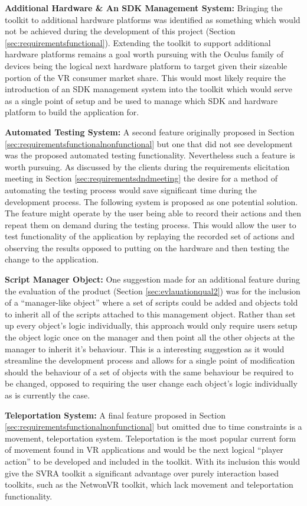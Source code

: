 \documentclass{l4proj}
\begin{document}
\textbf{Additional Hardware \& An SDK Management System:} Bringing the toolkit to additional hardware platforms was identified as something which would not be achieved during the development of this project (Section \ref{sec:requirementsfunctional}). Extending the toolkit to support additional hardware platforms remains a goal worth pursuing with the Oculus family of devices being the logical next hardware platform to target given their sizeable portion of the VR consumer market share. This would most likely require the introduction of an SDK management system into the toolkit which would serve as a single point of setup and be used to manage which SDK and hardware platform to build the application for.

\textbf{Automated Testing System:} 
A second feature originally proposed in Section \ref{sec:requirementsfunctionalnonfunctional} but one that did not see development was the proposed automated testing functionality. Nevertheless such a feature is worth pursuing. As discussed by the clients during the requirements elicitation meeting in Section \ref{sec:requirementsdndmeeting} the desire for a method of automating the testing process would save significant time during the development process. The following system is proposed as one potential solution. The feature might operate by the user being able to record their actions and then repeat them on demand during the testing process. This would allow the user to test functionality of the application by replaying the recorded set of actions and observing the results opposed to putting on the hardware and then testing the change to the application.

\textbf{Script Manager Object:} One suggestion made for an additional feature during the evaluation of the product (Section \ref{sec:evlauationqual2}) was for the inclusion of a ``manager-like object'' where a set of scripts could be added and objects told to inherit all of the scripts attached to this management object. Rather than set up every object's logic individually, this approach would only require users setup the object logic once on the manager and then point all the other objects at the manager to inherit it's behaviour. This is a interesting suggestion as it would streamline the development process and allows for a single point of modification should the behaviour of a set of objects with the same behaviour be required to be changed, opposed to  requiring the user change each object's logic individually as is currently the case.

\textbf{Teleportation System:} 
A final feature proposed in Section \ref{sec:requirementsfunctionalnonfunctional} but omitted due to time constraints is a movement, teleportation system. Teleportation is the most popular current form of movement found in VR applications and would be the next logical ``player action'' to be developed and included in the toolkit. With its inclusion this would give the SVRA toolkit a significant advantage over purely interaction based toolkits, such as the NetwonVR toolkit, which lack movement and teleportation functionality. 
\end{document}
